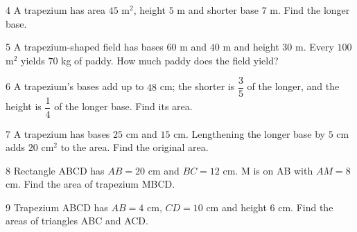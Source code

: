 \gap
\begin{probbox}{4}{\relax}
A trapezium has area $45$ m$^2$, height $5$ m and shorter base $7$ m. Find the longer base.
\end{probbox}
\gap
\begin{probbox}{5}{\relax}
A trapezium-shaped field has bases $60$ m and $40$ m and height $30$ m. Every $100$ m$^2$ yields $70$ kg of paddy. How much paddy does the field yield?
\end{probbox}
\gap
\begin{probbox}{6}{\relax}
A trapezium's bases add up to $48$ cm; the shorter is $\dfrac35$ of the longer, and the height is $\dfrac14$ of the longer base. Find its area.
\end{probbox}
\gap
\begin{probbox}{7}{\relax}
A trapezium has bases $25$ cm and $15$ cm. Lengthening the longer base by $5$ cm adds $20$ cm$^2$ to the area. Find the original area.
\end{probbox}
\gap
\begin{probbox}{8}{\relax}
Rectangle ABCD has $AB=20$ cm and $BC=12$ cm. M is on AB with $AM=8$ cm. Find the area of trapezium MBCD.
\end{probbox}
\gap
\begin{probbox}{9}{\relax}
Trapezium ABCD has $AB=4$ cm, $CD=10$ cm and height $6$ cm. Find the areas of triangles ABC and ACD.
\end{probbox}
